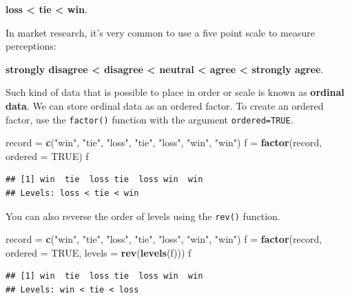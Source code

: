 \documentclass[
]{book}
\newenvironment{Shaded}{\begin{snugshade}}{\end{snugshade}}
\newcommand{\DataTypeTok}[1]{\textcolor[rgb]{0.13,0.29,0.53}{#1}}
\newcommand{\KeywordTok}[1]{\textcolor[rgb]{0.13,0.29,0.53}{\textbf{#1}}}
\newcommand{\NormalTok}[1]{#1}
\newcommand{\OtherTok}[1]{\textcolor[rgb]{0.56,0.35,0.01}{#1}}
\newcommand{\StringTok}[1]{\textcolor[rgb]{0.31,0.60,0.02}{#1}}
\begin{document}
\textbf{loss \textless{} tie \textless{} win}.

In market research, it's very common to use a five point scale to measure perceptions:

\textbf{strongly disagree \textless{} disagree \textless{} neutral \textless{} agree \textless{} strongly agree}.

Such kind of data that is possible to place in order or scale is known as \textbf{ordinal data}. We can store ordinal data as an ordered factor. To create an ordered factor, use the \texttt{factor()} function with the argument \texttt{ordered=TRUE}.

\begin{Shaded}
\begin{Highlighting}[]
\NormalTok{record =}\StringTok{ }\KeywordTok{c}\NormalTok{(}\StringTok{"win"}\NormalTok{, }\StringTok{"tie"}\NormalTok{, }\StringTok{"loss"}\NormalTok{, }\StringTok{"tie"}\NormalTok{, }\StringTok{"loss"}\NormalTok{, }\StringTok{"win"}\NormalTok{, }\StringTok{"win"}\NormalTok{)}
\NormalTok{f =}\StringTok{ }\KeywordTok{factor}\NormalTok{(record, }
            \DataTypeTok{ordered =} \OtherTok{TRUE}\NormalTok{)}
\NormalTok{f}
\end{Highlighting}
\end{Shaded}

\begin{verbatim}
## [1] win  tie  loss tie  loss win  win 
## Levels: loss < tie < win
\end{verbatim}

You can also reverse the order of levels using the \texttt{rev()} function.

\begin{Shaded}
\begin{Highlighting}[]
\NormalTok{record =}\StringTok{ }\KeywordTok{c}\NormalTok{(}\StringTok{"win"}\NormalTok{, }\StringTok{"tie"}\NormalTok{, }\StringTok{"loss"}\NormalTok{, }\StringTok{"tie"}\NormalTok{, }\StringTok{"loss"}\NormalTok{, }\StringTok{"win"}\NormalTok{, }\StringTok{"win"}\NormalTok{)}
\NormalTok{f =}\StringTok{ }\KeywordTok{factor}\NormalTok{(record, }
            \DataTypeTok{ordered =} \OtherTok{TRUE}\NormalTok{, }
            \DataTypeTok{levels =} \KeywordTok{rev}\NormalTok{(}\KeywordTok{levels}\NormalTok{(f)))}
\NormalTok{f}
\end{Highlighting}
\end{Shaded}

\begin{verbatim}
## [1] win  tie  loss tie  loss win  win 
## Levels: win < tie < loss
\end{verbatim}
\end{document}

